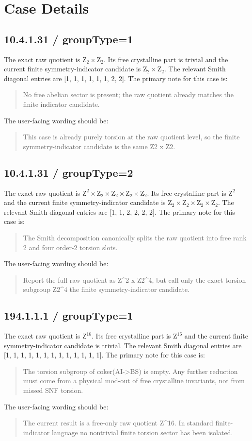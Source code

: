 \documentclass[11pt]{article}
\begin{document}
        \section{Case Details}
        \subsection*{10.4.1.31 / groupType=1}
The exact raw quotient is $\mathrm{Z}_{2} \times \mathrm{Z}_{2}$.
Its free crystalline part is $\mathrm{trivial}$ and the current finite symmetry-indicator candidate is $\mathrm{Z}_{2} \times \mathrm{Z}_{2}$.
The relevant Smith diagonal entries are [1, 1, 1, 1, 1, 1, 2, 2].
The primary note for this case is:
\begin{quote}
No free abelian sector is present; the raw quotient already matches the finite indicator candidate.
\end{quote}
The user-facing wording should be:
\begin{quote}
This case is already purely torsion at the raw quotient level, so the finite symmetry-indicator candidate is the same Z2 x Z2.
\end{quote}
\subsection*{10.4.1.31 / groupType=2}
The exact raw quotient is $\mathrm{Z}^{2} \times \mathrm{Z}_{2} \times \mathrm{Z}_{2} \times \mathrm{Z}_{2} \times \mathrm{Z}_{2}$.
Its free crystalline part is $\mathrm{Z}^{2}$ and the current finite symmetry-indicator candidate is $\mathrm{Z}_{2} \times \mathrm{Z}_{2} \times \mathrm{Z}_{2} \times \mathrm{Z}_{2}$.
The relevant Smith diagonal entries are [1, 1, 2, 2, 2, 2].
The primary note for this case is:
\begin{quote}
The Smith decomposition canonically splits the raw quotient into free rank 2 and four order-2 torsion slots.
\end{quote}
The user-facing wording should be:
\begin{quote}
Report the full raw quotient as Z\textasciicircum{}2 x Z2\textasciicircum{}4, but call only the exact torsion subgroup Z2\textasciicircum{}4 the finite symmetry-indicator candidate.
\end{quote}
\subsection*{194.1.1.1 / groupType=1}
The exact raw quotient is $\mathrm{Z}^{16}$.
Its free crystalline part is $\mathrm{Z}^{16}$ and the current finite symmetry-indicator candidate is $\mathrm{trivial}$.
The relevant Smith diagonal entries are [1, 1, 1, 1, 1, 1, 1, 1, 1, 1, 1, 1, 1].
The primary note for this case is:
\begin{quote}
The torsion subgroup of coker(AI->BS) is empty. Any further reduction must come from a physical mod-out of free crystalline invariants, not from missed SNF torsion.
\end{quote}
The user-facing wording should be:
\begin{quote}
The current result is a free-only raw quotient Z\textasciicircum{}16. In standard finite-indicator language no nontrivial finite torsion sector has been isolated.
\end{quote}
\end{document}
